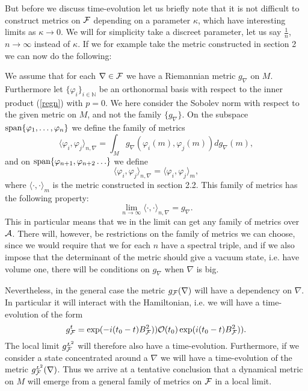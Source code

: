 \documentclass[letterpaper,11pt]{article}
\def\ca{{\cal A}}
\def\cf{{\cal F}}
\def\co{{\cal O}}
\begin{document}
But before we discuss time-evolution let us briefly note that it is not difficult to construct metrics on $\cf$ depending on a parameter $\kappa$, which have interesting limits as $\kappa \to 0$. We will for simplicity take a discreet parameter, let us say $\frac{1}{n}$, $n\to \infty$ instead of $\kappa$. If we for example take the metric constructed in section 2 we can now do the following:  

We assume that for each $\nabla  \in \cf$ we have a Riemannian metric $g_\nabla$ on $M$. Furthermore let    $\{\varphi_i \}_{i\in \mathbb{N}}$ be an orthonormal basis with respect to the inner product (\ref{regn}) with $p=0$. We here consider the Sobolev norm with respect to the given metric on $M$, and not the family  $\{ g_\nabla \}$. On the subspace $\hbox{span}\{\varphi_1,\ldots , \varphi_n \}$ we define the family of metrics
$$\langle  \varphi_i, \varphi_j \rangle_{n,\nabla} =\int_M g_\nabla (\varphi_i (m) , \varphi_j(m))dg_\nabla (m)  ,$$
and on $\hbox{span}\{\varphi_{n+1},\varphi_{n+2}\ldots  \}$ we define 
$$ \langle  \varphi_i, \varphi_j \rangle_{n,\nabla} = \langle \varphi_i,  \varphi_j \rangle_m  , $$
where $\langle \cdot , \cdot \rangle_{m}$ is the metric constructed in section 2.2. 
This family of metrics has the following property: 
$$\lim_{n\to \infty} \langle \cdot , \cdot \rangle_{n,\nabla} =g_\nabla .$$
This in particular means that we in the limit can get any family of metrics over $\ca$. There will, however, be restrictions on the family of metrics we can choose, since we would require that we for each $n$ have a spectral triple, and if we also impose that the determinant of the metric should give a vacuum state, i.e. have volume one, there will be conditions on $g_\nabla$ when $\nabla$ is big. 


Nevertheless, in the general case the metric $ g_{\cf}(\nabla)  $ will have a dependency on $\nabla$.  In particular it will interact with the Hamiltonian, i.e. we will have a time-evolution of the form 
\begin{equation} g_{\cf}^t = \exp(- i(t_0 - t) B^2_\cf )) 
\co(t_0)
\exp( i(t_0 - t) B^2_\cf )).
\label{time}
\end{equation}
The local limit $g_{\cf}^{\mbox{\tiny$L^2$}}$ will therefore also have a time-evolution. Furthermore, if we consider a state concentrated around a $\nabla$ we will have a time-evolution of the metric   $g_{\cf}^{\mbox{\tiny$L^2$}}(\nabla)$. Thus we arrive at a tentative conclusion that a dynamical metric on $M$ will emerge from a general family of metrics on $\cf$ in a  local limit.
\end{document}
